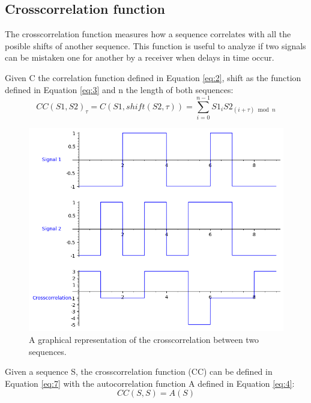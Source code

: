 \subsection{Crosscorrelation function}

The crosscorrelation function measures how a sequence correlates with all
the posible shifts of another sequence. This function is useful to analyze if two
signals can be mistaken one for another by a receiver when delays in time occur.


\begin{definition}[Crosscorrelation]\label{def:4}
  Given C the correlation function defined in Equation \eqref{eq:2}, shift as the function defined in Equation \eqref{eq:3} and n the length of both sequences:
  \begin{equation}\label{eq:7}
    CC(S1, S2)_{\tau} = C(S1, shift(S2, \tau)) = \sum_{i=0}^{n-1}S1_{i}S2_{(i+\tau) \bmod n}
  \end{equation}
\end{definition}

\begin{figure}[ht!] %
\begin{center}
\includegraphics[width=0.7\linewidth]{Chapters/Introduction/signals_crosscorrelation}
\end{center}
\caption{A graphical representation of the crosscorrelation between two sequences.}
\label{introduction_signals_crosscorrelation}
\end{figure}

\begin{definition}\label{lem:1}
  Given a sequence S, the crosscorrelation function  (CC) can be defined in Equation
  \eqref{eq:7} with the autocorrelation function A defined in Equation \eqref{eq:4}:
  \begin{equation}\label{eq:8}
    CC(S, S) = A(S)
  \end{equation}
\end{definition}












